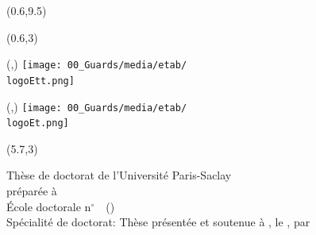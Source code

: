 \begin{titlepage}
    \begin{textblock}{1}(0.6,9.5)
      \Huge{}
    \end{textblock}
    
    \begin{textblock}{1}(0.6,3)
      \Large{}
    \end{textblock}
    
    \begin{textblock}{1}(\hpostt,\vpostt)
      \texttt{[image: 00\_Guards/media/etab/\\logoEtt.png]}
    \end{textblock}
    
    \begin{textblock}{1}(\hpos,\vpos)
      \texttt{[image: 00\_Guards/media/etab/\\logoEt.png]}
    \end{textblock}
    
    \begin{textblock}{10}(5.7,3)
      
      \color{bordeau}
      \begin{flushright}
        \huge{\PhDTitle} \bigskip %
        \vfill
        \color{black} %
        \normalsize {Thèse de doctorat de l'Université Paris-Saclay} \\
        préparée à \PhDworkingplace \\ \bigskip
        \vfill
        École doctorale n$^{\circ}$\ecodocnum ~\ecodoctitle ~(\ecodocacro)  \\
        
        \small{Spécialité de doctorat: \PhDspeciality} \bigskip %
        \vfill  
        \footnotesize{Thèse présentée et soutenue à , le , par} \bigskip
        \vfill
        \Large{\textbf{\textsc{\PhDname}}} %
        \vfill
      \end{flushright}
      
      \color{black}
      \begin{flushleft}


\end{flushleft}
\end{textblock}
\end{titlepage}
